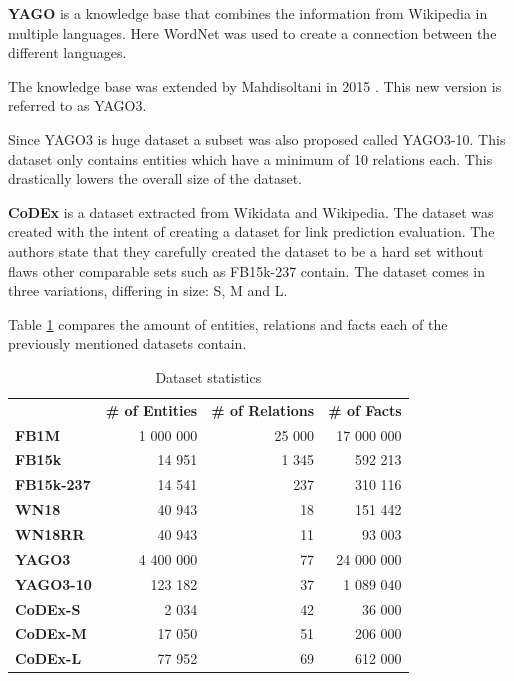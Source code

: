 \textbf{YAGO} is a knowledge base that combines the information from Wikipedia in multiple languages. Here WordNet was used to create a connection between the different languages.  

The knowledge base was extended by Mahdisoltani in 2015 \cite{mahdisoltani_yago3_2015}. This new version is referred to as YAGO3. 

Since YAGO3 is huge dataset a subset was also proposed called YAGO3-10. This dataset only contains entities which have a minimum of 10 relations each. This drastically lowers the overall size of the dataset. \hfill \break

\textbf{CoDEx} \cite{safavi_codex_2020} is a dataset extracted from Wikidata and Wikipedia. The dataset was created with the intent of creating a dataset for link prediction evaluation. The authors state that they carefully created the dataset to be a hard set without flaws other comparable sets such as FB15k-237 contain. The dataset comes in three variations, differing in size: S, M and L. \hfill \break

Table \ref{tab:dataset_stats} compares the amount of entities, relations and facts each of the previously mentioned datasets contain.

\begin{table}[]
\centering
\begin{tabular}{lrrr}
 & \multicolumn{1}{l}{\textbf{\# of Entities}} & \multicolumn{1}{l}{\textbf{\# of Relations}} & \multicolumn{1}{l}{\textbf{\# of Facts}} \\
\textbf{FB1M} & 1 000 000 & 25 000 & 17 000 000 \\
\textbf{FB15k} & 14 951 & 1 345 & 592 213 \\
\textbf{FB15k-237} & 14 541 & 237 & 310 116 \\
\textbf{WN18} & 40 943 & 18 & 151 442 \\
\textbf{WN18RR} & 40 943 & 11 & 93 003 \\
\textbf{YAGO3} & 4 400 000 & 77 & 24 000 000 \\
\textbf{YAGO3-10} & 123 182 & 37 & 1 089 040 \\
\textbf{CoDEx-S} & 2 034 & 42 & 36 000 \\
\textbf{CoDEx-M} & 17 050 & 51 & 206 000 \\
\textbf{CoDEx-L} & 77 952 & 69 & 612 000
\end{tabular}
\caption{Dataset statistics}
\label{tab:dataset_stats}
\end{table}
